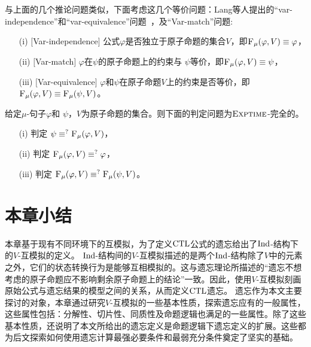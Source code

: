 与上面的几个推论问题类似，下面考虑这几个等价问题：Lang等人提出的“var-independence”和“var-equivalence”问题~\cite{DBLP:journals/jair/LangLM03}，及“Var-match”问题:
\begin{itemize}
	\item[(i)] $[$Var-independence$]$ 公式$\varphi$是否独立于原子命题的集合$V$，即${\textsc{F}_{\textsc{$\mu$}}}(\varphi,V) \equiv \varphi$，
	\item[(ii)] $[$Var-match$]$  $\varphi$在$\psi$的原子命题上的约束与 $\psi$等价，即${\textsc{F}_{\textsc{$\mu$}}}(\varphi, V) \equiv \psi$，
	\item[(iii)] $[$Var-equivalence$]$  $\varphi$和$\psi$在原子命题$V$上的约束是否等价，即${\textsc{F}_{\textsc{$\mu$}}}(\varphi, V) \equiv {\textsc{F}_{\textsc{$\mu$}}}(\psi, V)$。
\end{itemize}

\begin{corollary}\label{chapter06:cor:equiv}
	给定$\mu$-句子$\varphi$和 $\psi$，$V$为原子命题的集合。则下面的判定问题为$\textsc{Exptime}$-完全的。
	\begin{itemize}
		\item[(i)] 判定 $\psi \equiv^?{\textsc{F}_{\textsc{$\mu$}}}(\varphi, V)$，
		\item[(ii)] 判定 ${\textsc{F}_{\textsc{$\mu$}}}(\varphi, V) \equiv^? \varphi$，
		\item[(iii)] 判定 ${\textsc{F}_{\textsc{$\mu$}}}(\varphi, V) \equiv^? {\textsc{F}_{\textsc{$\mu$}}}(\psi, V)$。
	\end{itemize}
\end{corollary}


\section{本章小结} 
本章基于现有不同环境下的互模拟，为了定义$\textrm{CTL}$公式的遗忘给出了$\textrm{Ind}$-结构下的$V$-互模拟的定义。
$\textrm{Ind}$-结构间的$V$-互模拟描述的是两个$\textrm{Ind}$-结构除了$V$中的元素之外，它们的状态转换行为是能够互相模拟的。这与遗忘理论所描述的“遗忘不想考虑的原子命题应不影响剩余原子命题上的结论”一致。因此，使用$V$-互模拟刻画原始公式与遗忘结果的模型之间的关系，从而定义$\textrm{CTL}$遗忘。
遗忘作为本文主要探讨的对象，本章通过研究$V$-互模拟的一些基本性质，探索遗忘应有的一般属性，这些属性包括：分解性、切片性、同质性及命题逻辑也满足的一些属性。除了这些基本性质，还说明了本文所给出的遗忘定义是命题逻辑下遗忘定义的扩展。这些都为后文探索如何使用遗忘计算最强必要条件和最弱充分条件奠定了坚实的基础。


